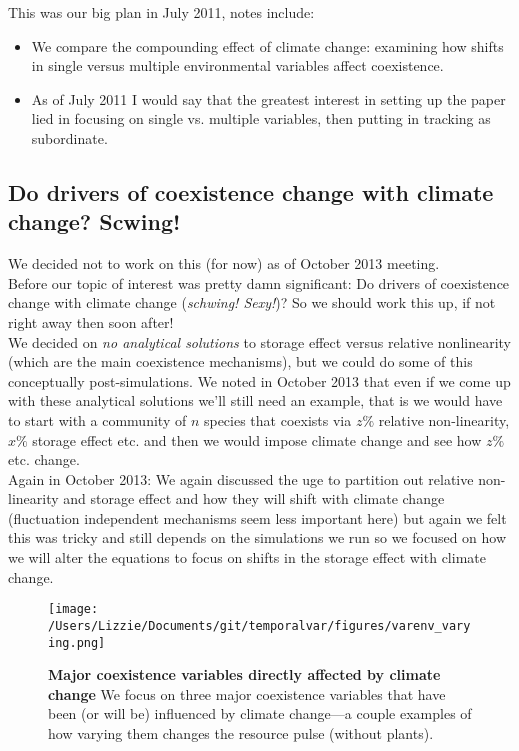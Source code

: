 \documentclass[11pt,a4paper,oneside]{article}
\begin{document}
This was our big plan in July 2011, notes include:\\
\begin{itemize}
\item We compare the compounding effect of climate change: examining
  how shifts in single versus multiple environmental variables affect
  coexistence.
\item As of July 2011 I would say that the greatest interest in setting up
the paper lied in focusing on single vs. multiple variables, then
putting in tracking as subordinate. 
\end{itemize}

\subsection{Do drivers of coexistence change with climate change? Scwing!}
\noindent We decided not to work on this (for now) as of October 2013 meeting.\\

 Before our topic of interest was pretty damn significant: Do drivers of coexistence change with climate change (\emph{schwing! Sexy!})? So we should work this up, if not right away then soon after!\\

We decided on \emph{no analytical solutions} to storage effect versus relative nonlinearity (which are the main coexistence mechanisms), but we could do some of this conceptually post-simulations. We noted in October 2013 that even if we come up with these analytical solutions we'll still need an example, that is we would have to start with a community of \(n\) species that coexists via \(z\%\) relative non-linearity, \(x\%\) storage effect etc. and then we would impose climate change and see how \(z\%\) etc. change.\\

Again in October 2013: We again discussed the uge to partition out relative non-linearity and storage effect and how they will shift with climate change (fluctuation independent mechanisms seem less important here) but again we felt this was tricky and still depends on the simulations we run so we focused on how we will alter the equations to focus on shifts in the storage effect with climate change.


\newpage
\begin{figure}[h!]
\centering
\noindent \texttt{[image: /Users/Lizzie/Documents/git/temporalvar/figures/varenv\_varying.png]}
\caption{{\bf Major coexistence variables directly affected by
    climate change}  We focus on three major coexistence variables
  that have been (or will be) influenced by climate change---a couple
  examples of how varying them changes the resource pulse (without plants).}
\end{figure}
\end{document}
